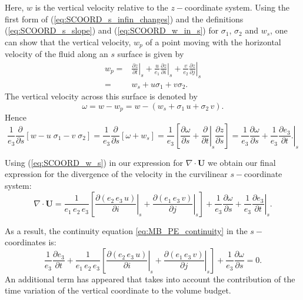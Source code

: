 \documentclass[../main/NEMO_manual]{subfiles}
\begin{document}
Here, $w$ is the vertical velocity relative to the $z-$coordinate system.
Using the first form of (\autoref{eq:SCOORD_s_infin_changes})
and the definitions (\autoref{eq:SCOORD_s_slope}) and (\autoref{eq:SCOORD_w_in_s}) for $\sigma_1$, $\sigma_2$ and  $w_s$,
one can show that the vertical velocity, $w_p$ of a point
moving with the horizontal velocity of the fluid along an $s$ surface is given by
\begin{equation}
\label{eq:SCOORD_w_p}
\begin{split}
w_p  = & \left. \frac{ \partial z }{\partial t} \right|_s
     + \frac{u}{e_1} \left. \frac{ \partial z }{\partial i} \right|_s
     + \frac{v}{e_2} \left. \frac{ \partial z }{\partial j} \right|_s \\
     = & w_s + u \sigma_1 + v \sigma_2 .
\end{split}
\end{equation}
 The vertical velocity across this surface is denoted by
\begin{equation}
  \label{eq:SCOORD_w_s}
  \omega  = w - w_p = w - ( w_s + \sigma_1 \,u + \sigma_2 \,v )  .
\end{equation}
Hence
\begin{equation}
\frac{1}{e_3 } \frac{\partial}{\partial s}   \left[  w -  u\;\sigma_1  - v\;\sigma_2  \right] =
\frac{1}{e_3 } \frac{\partial}{\partial s} \left[  \omega + w_s \right] =
   \frac{1}{e_3 } \left[ \frac{\partial \omega}{\partial s}
 + \left. \frac{ \partial }{\partial t} \right|_s \frac{\partial z}{\partial s} \right] =
   \frac{1}{e_3 } \frac{\partial \omega}{\partial s} + \frac{1}{e_3 } \left. \frac{ \partial e_3}{\partial t} . \right|_s
\end{equation}

Using (\autoref{eq:SCOORD_w_s}) in our expression for $\nabla \cdot {\mathrm {\mathbf U}}$ we obtain
our final expression for the divergence of the velocity in the curvilinear $s-$coordinate system:
\begin{equation}
      \nabla \cdot {\mathrm {\mathbf U}} =
         \frac{1}{e_1 \,e_2 \,e_3 }    \left[
		  \left.  \frac{\partial (e_2 \,e_3 \,u)}{\partial i} \right|_s
        +\left.  \frac{\partial (e_1 \,e_3 \,v)}{\partial j} \right|_s        \right]
        + \frac{1}{e_3 } \frac{\partial \omega }{\partial s}
        + \frac{1}{e_3 } \left. \frac{\partial e_3}{\partial t} \right|_s .
\end{equation}

As a result, the continuity equation \autoref{eq:MB_PE_continuity} in the $s-$coordinates is:
\begin{equation}
  \label{eq:SCOORD_sco_Continuity}
  \frac{1}{e_3 } \frac{\partial e_3}{\partial t}
  + \frac{1}{e_1 \,e_2 \,e_3 }\left[
    {\left. {\frac{\partial (e_2 \,e_3 \,u)}{\partial i}} \right|_s
      +  \left. {\frac{\partial (e_1 \,e_3 \,v)}{\partial j}} \right|_s } \right]
  +\frac{1}{e_3 }\frac{\partial \omega }{\partial s} = 0 .
\end{equation}
An additional term has appeared that takes into account
the contribution of the time variation of the vertical coordinate to the volume budget.
\end{document}
